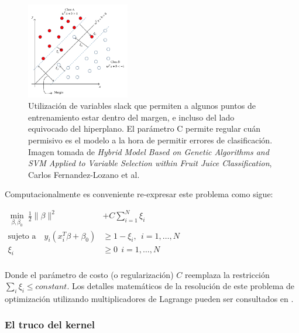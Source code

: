 \begin{figure}[h!]
\begin{center}
  \includegraphics[width=0.4\textwidth]{Kap1/slack.jpg} 
  \end{center}
 \caption{ Utilización de variables slack que permiten a algunos puntos de entrenamiento estar dentro del margen, e incluso del lado equivocado del hiperplano. El parámetro C permite regular cuán permisivo es el modelo a la hora de permitir errores de clasificación. Imagen tomada de \textit{Hybrid Model Based on Genetic Algorithms and SVM Applied to Variable Selection within Fruit Juice Classification}, Carlos Fernandez-Lozano et al. }
\label{fig:svm_5}
\end{figure}

Computacionalmente es conveniente re-expresar este problema como sigue:

\begin{center}
$\begin{aligned}
\min\limits_{\beta, \beta_0} \   \frac{1}{2} \| \beta \|^2 &+ C \sum\limits_{i=1}^N \xi_i \\
\textrm{sujeto a} \quad  y_{i}(x_i^T \beta + \beta_0)
  &\geq 1 - \xi_i, \ \ i=1,\ldots,N    \\
  \xi_i &\geq 0 \ \ i=1,\ldots,N    \\
\end{aligned}
$
\end{center}

Donde el parámetro de costo (o regularización) $C$ reemplaza la restricción $\sum\limits_i \xi_i \leq constant$. Los detalles matemáticos de la resolución de este problema de optimización utilizando multiplicadores de Lagrange pueden ser consultados en \cite{statisticallearning}. \\

\subsubsection{El truco del kernel}

